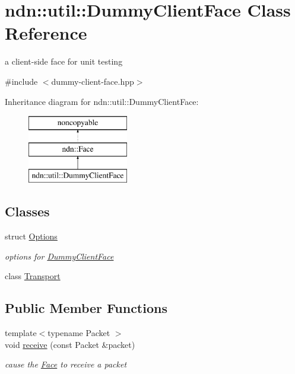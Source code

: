 \hypertarget{classndn_1_1util_1_1DummyClientFace}{}\section{ndn\+:\+:util\+:\+:Dummy\+Client\+Face Class Reference}
\label{classndn_1_1util_1_1DummyClientFace}


a client-\/side face for unit testing  




{\ttfamily \#include $<$dummy-\/client-\/face.\+hpp$>$}

Inheritance diagram for ndn\+:\+:util\+:\+:Dummy\+Client\+Face\+:\begin{figure}[H]
\begin{center}
\leavevmode
\includegraphics[height=3.000000cm]{classndn_1_1util_1_1DummyClientFace}
\end{center}
\end{figure}
\subsection*{Classes}
\begin{DoxyCompactItemize}
\item 
struct \hyperlink{structndn_1_1util_1_1DummyClientFace_1_1Options}{Options}
\begin{DoxyCompactList}\small\item\em options for \hyperlink{classndn_1_1util_1_1DummyClientFace}{Dummy\+Client\+Face} \end{DoxyCompactList}\item 
class \hyperlink{classndn_1_1util_1_1DummyClientFace_1_1Transport}{Transport}
\end{DoxyCompactItemize}
\subsection*{Public Member Functions}
\begin{DoxyCompactItemize}
\item 
{\footnotesize template$<$typename Packet $>$ }\\void \hyperlink{classndn_1_1util_1_1DummyClientFace_a7795d8e3f4cc79f0e0f8b5a67b8af6b1}{receive} (const Packet \&packet)
\begin{DoxyCompactList}\small\item\em cause the \hyperlink{classndn_1_1Face}{Face} to receive a packet \end{DoxyCompactList}\end{DoxyCompactItemize}
